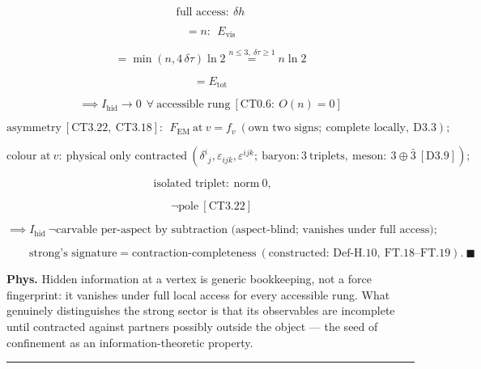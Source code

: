 \begin{theorem}
\[
\text{full access}:\ \delta h
\]

\[
= n:\ \ E_{\mathrm{vis}}
\]

\[
= \min(n,4\,\delta\tau)\ln2\overset{n\le3,\ \delta\tau\ge1}{=}n\ln2
\]

\[
= E_{\mathrm{tot}}
\]

\[
\implies I_{\mathrm{hid}}\to0\ \ \forall\ \text{accessible rung}\ [\mathrm{CT0.6}:\ O(n)=0]
\]

\[
\text{asymmetry}\ [\mathrm{CT3.22},\ \mathrm{CT3.18}]:\ \ F_{\mathrm{EM}}\ \text{at}\ v=f_v\ (\text{own two signs};\ \text{complete locally},\ \mathrm{D3.3});
\]

\[
\text{colour at}\ v:\ \text{physical only contracted}\ (\delta^i{}_j,\varepsilon_{ijk},\varepsilon^{ijk};\ \text{baryon}:3\ \text{triplets},\ \text{meson}:\ 3\oplus\bar3\ [\mathrm{D3.9}]);
\]

\[
\ \ \text{isolated triplet}:\ \text{norm}\ 0,
\]

\[
\ \neg\text{pole}\ [\mathrm{CT3.22}]
\]

\[
\implies I_{\mathrm{hid}}\ \neg\text{carvable per-aspect by subtraction (aspect-blind; vanishes under full access)};
\]

\[
\qquad \text{strong's signature}=\text{contraction-completeness}\ (\text{constructed: Def-H.10},\ \mathrm{FT.18}\text{--}\mathrm{FT.19}).\ \blacksquare
\]

\textbf{Phys.} Hidden information at a vertex is generic bookkeeping, not a force fingerprint: it vanishes under full local access for every accessible rung. What genuinely distinguishes the strong sector is that its observables are incomplete until contracted against partners possibly outside the object — the seed of confinement as an information-theoretic property.

\vspace{2pt}\noindent\rule{\textwidth}{0.4pt}\vspace{2pt}

\end{theorem}

